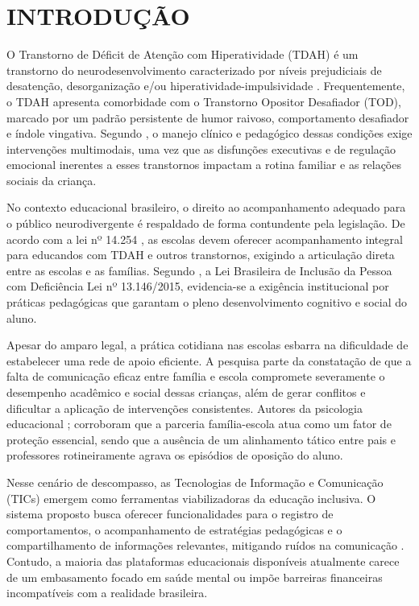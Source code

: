 
\chapter{INTRODUÇÃO}
\label{chap:introducao}

O Transtorno de Déficit de Atenção com Hiperatividade (TDAH) é um transtorno do neurodesenvolvimento caracterizado por níveis prejudiciais de desatenção, desorganização e/ou hiperatividade-impulsividade \cite{apa2014}. Frequentemente, o TDAH apresenta comorbidade com o Transtorno Opositor Desafiador (TOD), marcado por um padrão persistente de humor raivoso, comportamento desafiador e índole vingativa. Segundo , o manejo clínico e pedagógico dessas condições exige intervenções multimodais, uma vez que as disfunções executivas e de regulação emocional inerentes a esses transtornos impactam a rotina familiar e as relações sociais da criança.

No contexto educacional brasileiro, o direito ao acompanhamento adequado para o público neurodivergente é respaldado de forma contundente pela legislação. De acordo com a lei nº 14.254 , as escolas devem oferecer acompanhamento integral para educandos com TDAH e outros transtornos, exigindo a articulação direta entre as escolas e as famílias. Segundo , a Lei Brasileira de Inclusão da Pessoa com Deficiência Lei nº 13.146/2015, evidencia-se a exigência institucional por práticas pedagógicas que garantam o pleno desenvolvimento cognitivo e social do aluno.

Apesar do amparo legal, a prática cotidiana nas escolas esbarra na dificuldade de estabelecer uma rede de apoio eficiente. A pesquisa parte da constatação de que a falta de comunicação eficaz entre família e escola compromete severamente o desempenho acadêmico e social dessas crianças, além de gerar conflitos e dificultar a aplicação de intervenções consistentes. Autores da psicologia educacional \cite{dessen2007}; \cite{epstein2011} corroboram que a parceria família-escola atua como um fator de proteção essencial, sendo que a ausência de um alinhamento tático entre pais e professores rotineiramente agrava os episódios de oposição do aluno.

Nesse cenário de descompasso, as Tecnologias de Informação e Comunicação (TICs) emergem como ferramentas viabilizadoras da educação inclusiva. O sistema proposto busca oferecer funcionalidades para o registro de comportamentos, o acompanhamento de estratégias pedagógicas e o compartilhamento de informações relevantes, mitigando ruídos na comunicação \cite{almeida2018}. Contudo, a maioria das plataformas educacionais disponíveis atualmente carece de um embasamento focado em saúde mental ou impõe barreiras financeiras incompatíveis com a realidade brasileira.

